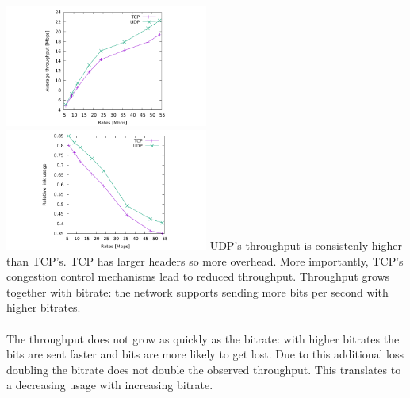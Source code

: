 \includegraphics[width=0.5\textwidth]{traces/L3-1-4-tput.pdf}
\includegraphics[width=0.5\textwidth]{traces/L3-1-4-usage.pdf}
UDP's throughput is consistenly higher than TCP's. TCP has larger headers so more overhead. More importantly, TCP's congestion control mechanisms lead to reduced throughput. Throughput grows together with bitrate: the network supports sending more bits per second with higher bitrates. \\ \\
The throughput does not grow as quickly as the bitrate: with higher bitrates the bits are sent faster and bits are more likely to get lost. Due to this additional loss doubling the bitrate does not double the observed throughput. This translates to a decreasing usage with increasing bitrate.
